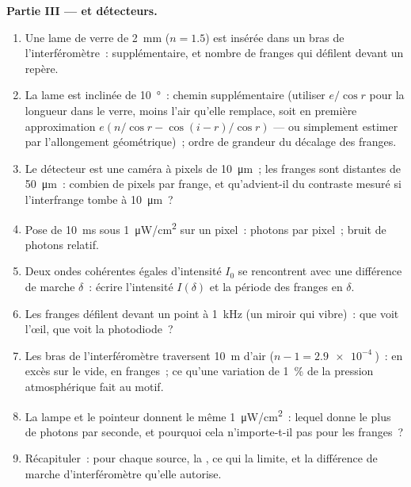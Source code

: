 \begin{problem}
\medskip
\noindent\textbf{Partie III ---  et détecteurs.}
\begin{enumerate}[resume]
  \item Une lame de verre de \qty{2}{mm} ($n = 1.5$) est insérée dans un bras de
        l'interféromètre~:  supplémentaire, et nombre de
        franges qui défilent devant un repère.
  \item La lame est inclinée de \qty{10}{\degree}~: chemin supplémentaire (utiliser $e/\cos r$
        pour la longueur dans le verre, moins l'air qu'elle remplace, soit en
        première approximation $e(n/\cos r - \cos(i - r)/\cos r)$ --- ou simplement
        estimer par l'allongement géométrique)~; ordre de grandeur
        du décalage des franges.
  \item Le détecteur est une caméra à pixels de \qty{10}{\micro m}~; les franges
        sont distantes de \qty{50}{\micro m}~: combien de pixels par frange, et qu'advient-il
        du contraste mesuré si l'interfrange tombe à
        \qty{10}{\micro m}~?
  \item Pose de \qty{10}{ms} sous \qty{1}{\micro W/cm^2} sur un pixel~: photons par
        pixel~; bruit de photons relatif.
  \item Deux ondes cohérentes égales d'intensité $I_0$ se rencontrent avec une différence
        de marche $\delta$~: écrire l'intensité $I(\delta)$ et la période
        des franges en $\delta$.
  \item Les franges défilent devant un point à \qty{1}{kHz} (un miroir qui
        vibre)~: que voit l'œil, que voit la photodiode~?
  \item Les bras de l'interféromètre traversent \qty{10}{m} d'air ($n - 1 =
        \qty{2.9e-4}{}$)~:  en excès sur le vide, en franges~;
        ce qu'une variation de \qty{1}{\%} de la pression atmosphérique fait au motif.
  \item La lampe et le pointeur donnent le même \qty{1}{\micro W/cm^2}~: lequel
        donne le plus de photons par seconde, et pourquoi cela n'importe-t-il pas pour
        les franges~?
  \item Récapituler~: pour chaque source, la , ce qui la limite,
        et la différence de marche d'interféromètre qu'elle autorise.
\end{enumerate}
\end{problem}

